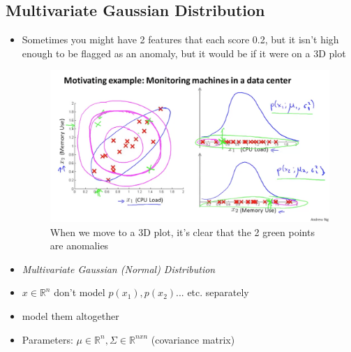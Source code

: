 \documentclass[]{article}
\begin{document}
	\subsection{Multivariate Gaussian Distribution}
		\begin{itemize}
			\item Sometimes you might have 2 features that each score 0.2, but it isn't high enough to be flagged as an anomaly, but it would be if it were on a 3D plot
			\begin{figure}[ht!]
				\includegraphics[width= 1.5\textwidth,center]{Multivariate_Gaussian.png}
				\caption{When we move to a 3D plot, it's clear that the 2 green points are anomalies}
			\end{figure}
			\item \emph{Multivariate Gaussian (Normal) Distribution}
			\item $x \in \mathbb{R}^n$ don't model $p(x_1),p(x_2)$... etc. separately
			\item model them altogether
			\item Parameters: $\mu \in \mathbb{R}^n,\Sigma \in \mathbb{R}^{n x n}$ (covariance matrix)
		\end{itemize}
		
\end{document}
